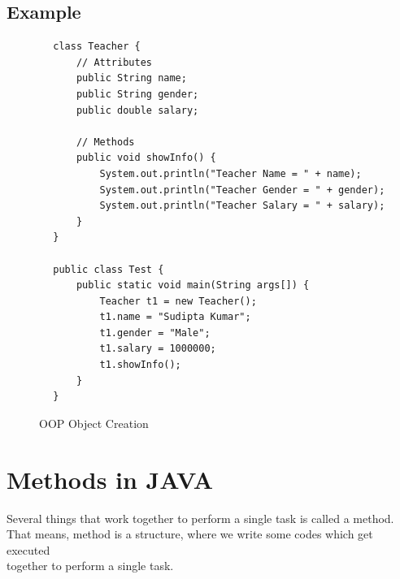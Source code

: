 \documentclass[openany]{book}  %
\begin{document}
\subsection{Example}
\begin{center}
    \begin{verbatim}
        class Teacher {
            // Attributes
            public String name;
            public String gender;
            public double salary;

            // Methods
            public void showInfo() {
                System.out.println("Teacher Name = " + name);
                System.out.println("Teacher Gender = " + gender);
                System.out.println("Teacher Salary = " + salary);
            }
        }

        public class Test {
            public static void main(String args[]) {
                Teacher t1 = new Teacher();
                t1.name = "Sudipta Kumar";
                t1.gender = "Male";
                t1.salary = 1000000;
                t1.showInfo();
            }
        }
    \end{verbatim}
\end{center}
% 
% 
\begin{figure}[htbp]
    \begin{center}
        \caption{OOP Object Creation}
    \end{center}
\end{figure}

\newpage

% 
%
\section{Methods in JAVA}
Several things that work together to perform a single task is called a method. \\
That means, method is a structure, where we write some codes which get executed \\
together to perform a single task.
% 
%
\end{document}
